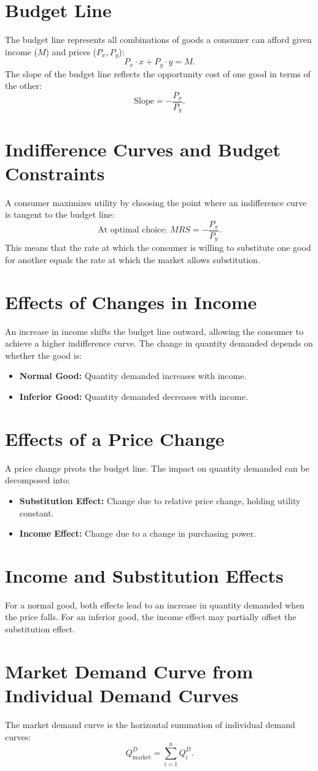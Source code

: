 \section*{Budget Line}
The budget line represents all combinations of goods a consumer can afford given income (\(M\)) and prices (\(P_x, P_y\)):
\[
P_x \cdot x + P_y \cdot y = M.
\]
The slope of the budget line reflects the opportunity cost of one good in terms of the other:
\[
\text{Slope} = -\frac{P_x}{P_y}.
\]

\section*{Indifference Curves and Budget Constraints}
A consumer maximizes utility by choosing the point where an indifference curve is tangent to the budget line:
\[
\text{At optimal choice: } MRS = -\frac{P_x}{P_y}.
\]
This means that the rate at which the consumer is willing to substitute one good for another equals the rate at which the market allows substitution.

\section*{Effects of Changes in Income}
An increase in income shifts the budget line outward, allowing the consumer to achieve a higher indifference curve. The change in quantity demanded depends on whether the good is:
\begin{itemize}
    \item \textbf{Normal Good:} Quantity demanded increases with income.
    \item \textbf{Inferior Good:} Quantity demanded decreases with income.
\end{itemize}

\section*{Effects of a Price Change}
A price change pivots the budget line. The impact on quantity demanded can be decomposed into:
\begin{itemize}
    \item \textbf{Substitution Effect:} Change due to relative price change, holding utility constant.
    \item \textbf{Income Effect:} Change due to a change in purchasing power.
\end{itemize}

\section*{Income and Substitution Effects}
For a normal good, both effects lead to an increase in quantity demanded when the price falls. For an inferior good, the income effect may partially offset the substitution effect.

\section*{Market Demand Curve from Individual Demand Curves}
The market demand curve is the horizontal summation of individual demand curves:
\[
Q^D_{\text{market}} = \sum_{i=1}^n Q^D_i.
\]